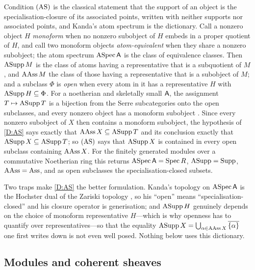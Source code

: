 \begin{remark}
  \label{R:Atoms}
  Condition \(\textup{(AS)}\) is the classical statement that the support of an object is the specialisation-closure of its associated points, written with neither supports nor associated points, and Kanda's atom spectrum \cite[Definitions~2.1, 3.1, 3.4 and~3.7]{Kanda12} is the dictionary. Call a nonzero object \(H\) \emph{monoform} when no nonzero subobject of \(H\) embeds in a proper quotient of \(H\), and call two monoform objects \emph{atom-equivalent} when they share a nonzero subobject; the atom spectrum \(\operatorname{ASpec}\mathsf{A}\) is the class of equivalence classes. Then \(\operatorname{ASupp} M\) is the class of atoms having a representative that is a subquotient of \(M\), and \(\operatorname{AAss} M\) the class of those having a representative that is a subobject of \(M\); and a subclass \(\Phi\) is \emph{open} when every atom in it has a representative \(H\) with \(\operatorname{ASupp} H\subseteq\Phi\). For a noetherian and skeletally small \(\mathsf{A}\), the assignment \(T\mapsto\operatorname{ASupp} T\) is a bijection from the Serre subcategories onto the open subclasses, and every nonzero object has a monoform subobject \cite[Theorems~4.3 and~2.9]{Kanda12}. Since every nonzero subobject of \(X\) then contains a monoform subobject, the hypothesis of \ref{D:AS} says exactly that \(\operatorname{AAss} X\subseteq\operatorname{ASupp} T\) and its conclusion exactly that \(\operatorname{ASupp} X\subseteq\operatorname{ASupp} T\); so \(\textup{(AS)}\) says that \(\operatorname{ASupp} X\) is contained in every open subclass containing \(\operatorname{AAss} X\). For the finitely generated modules over a commutative Noetherian ring this returns \(\operatorname{ASpec}\mathsf{A}=\operatorname{Spec} R\), \(\operatorname{ASupp}=\operatorname{Supp}\), \(\operatorname{AAss}=\operatorname{Ass}\), and as open subclasses the specialisation-closed subsets.

	Two traps make \ref{D:AS} the better formulation. Kanda's topology on \(\operatorname{ASpec}\mathsf{A}\) is the Hochster dual of the Zariski topology \cite[Remark~7.4]{Kanda12}, so his ``open'' means ``specialisation-closed'' and his closure operator is generisation; and \(\operatorname{ASupp} H\) genuinely depends on the choice of monoform representative \(H\)---which is why openness has to quantify over representatives---so that the equality \(\operatorname{ASupp} X=\bigcup_{\alpha\in\operatorname{AAss} X}\overline{\{\alpha\}}\) one first writes down is not even well posed. Nothing below uses this dictionary.
\end{remark}

\subsection{Modules and coherent sheaves}\label{SS:ModelExamples}

